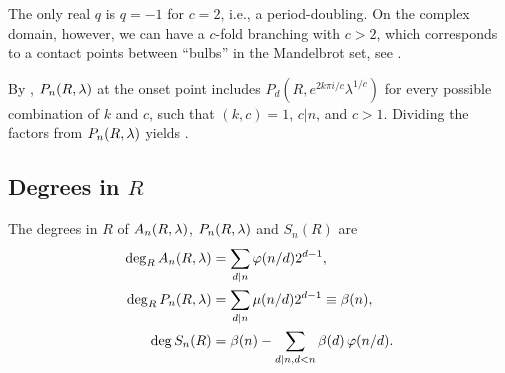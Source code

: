 \documentclass[preprint]{revtex4-1}
\begin{document}
\begin{remark}
The only real $q$ is $q = -1$ for $c=2$, i.e., a period-doubling.
%
On the complex domain, however, we can have a $c$-fold branching with $c>2$,
  which corresponds to a contact points between ``bulbs''
  in the Mandelbrot set, see .
\end{remark}


By , $P_n(R, \lambda)$ at the onset point
includes $P_d(R, e^{2 k \pi i/c} \lambda^{1/c})$ for every
  possible combination of $k$ and $c$, such that
  $(k, c) = 1$, $c|n$, and $c > 1$.
%
Dividing the factors from $P_n(R, \lambda)$ yields .










\subsection{\label{sec:degR}Degrees in $R$}



\begin{theorem}
The degrees in $R$ of $A_n(R, \lambda)$, $P_n(R, \lambda)$ and $S_n(R)$ are
\begin{subequations}
\begin{align}
\deg_R A_n(R, \lambda) &= \sum_{d|n} \varphi(n/d) 2^{d-1}, \\
\deg_R P_n(R, \lambda) &= \sum_{d|n} \mu(n/d) 2^{d-1} \equiv \beta(n), \\
\deg S_n(R) &= \beta(n) - \sum_{d | n, d < n} \beta(d) \, \varphi(n/d).
\end{align}
\label{eq:degR}
\end{subequations}
\label{thm:degR}
\end{theorem}
\end{document}
